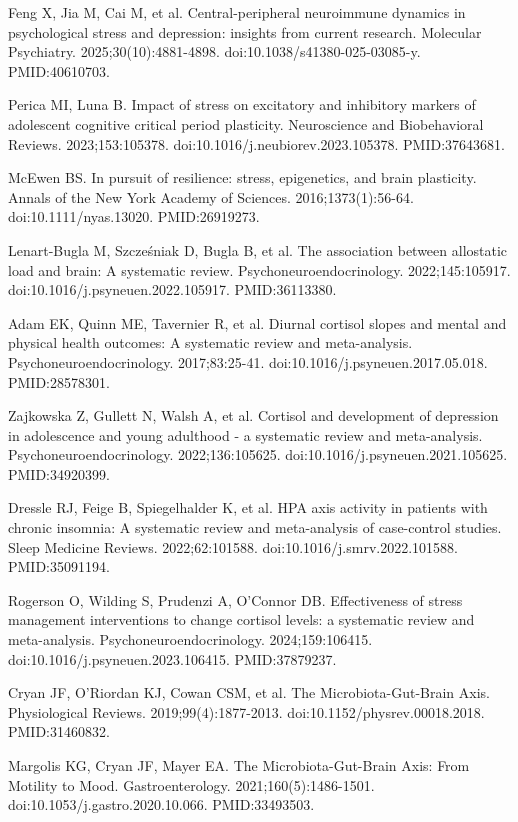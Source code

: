 \documentclass[12pt,oneside]{book}
\newcommand{\reff}[2]{\par\hangindent=7mm\hangafter=1\noindent[#1]\hspace{2mm}#2\par}
\begin{document}
\reff{10}{Feng X, Jia M, Cai M, et al. Central-peripheral neuroimmune dynamics in psychological stress and depression: insights from current research. Molecular Psychiatry. 2025;30(10):4881-4898. doi:10.1038/s41380-025-03085-y. PMID:40610703.}

\reff{11}{Perica MI, Luna B. Impact of stress on excitatory and inhibitory markers of adolescent cognitive critical period plasticity. Neuroscience and Biobehavioral Reviews. 2023;153:105378. doi:10.1016/j.neubiorev.2023.105378. PMID:37643681.}

\reff{12}{McEwen BS. In pursuit of resilience: stress, epigenetics, and brain plasticity. Annals of the New York Academy of Sciences. 2016;1373(1):56-64. doi:10.1111/nyas.13020. PMID:26919273.}

\reff{13}{Lenart-Bugla M, Szcześniak D, Bugla B, et al. The association between allostatic load and brain: A systematic review. Psychoneuroendocrinology. 2022;145:105917. doi:10.1016/j.psyneuen.2022.105917. PMID:36113380.}

\reff{14}{Adam EK, Quinn ME, Tavernier R, et al. Diurnal cortisol slopes and mental and physical health outcomes: A systematic review and meta-analysis. Psychoneuroendocrinology. 2017;83:25-41. doi:10.1016/j.psyneuen.2017.05.018. PMID:28578301.}

\reff{15}{Zajkowska Z, Gullett N, Walsh A, et al. Cortisol and development of depression in adolescence and young adulthood - a systematic review and meta-analysis. Psychoneuroendocrinology. 2022;136:105625. doi:10.1016/j.psyneuen.2021.105625. PMID:34920399.}

\reff{16}{Dressle RJ, Feige B, Spiegelhalder K, et al. HPA axis activity in patients with chronic insomnia: A systematic review and meta-analysis of case-control studies. Sleep Medicine Reviews. 2022;62:101588. doi:10.1016/j.smrv.2022.101588. PMID:35091194.}

\reff{17}{Rogerson O, Wilding S, Prudenzi A, O'Connor DB. Effectiveness of stress management interventions to change cortisol levels: a systematic review and meta-analysis. Psychoneuroendocrinology. 2024;159:106415. doi:10.1016/j.psyneuen.2023.106415. PMID:37879237.}

\reff{18}{Cryan JF, O'Riordan KJ, Cowan CSM, et al. The Microbiota-Gut-Brain Axis. Physiological Reviews. 2019;99(4):1877-2013. doi:10.1152/physrev.00018.2018. PMID:31460832.}

\reff{19}{Margolis KG, Cryan JF, Mayer EA. The Microbiota-Gut-Brain Axis: From Motility to Mood. Gastroenterology. 2021;160(5):1486-1501. doi:10.1053/j.gastro.2020.10.066. PMID:33493503.}
\end{document}
